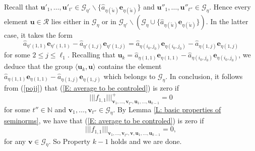 \documentclass[11pt]{amsart}
\theoremstyle{definition}
\newcommand{\N}{{\mathbb N}}
\newcommand{\CG}{{\mathcal G}}
\newcommand{\be}{{\mathbf{e}}}
\newcommand{\bu}{{\mathbf{u}}}
\newcommand{\bv}{{\mathbf{v}}}
\newcommand{\nnorm}[1]{\lvert\!|\!| #1|\!|\!\rvert}
\newcommand{\1}{{\mathbf{1}}}
\begin{document}

 Recall that $\bu'_{1},\dots,\bu'_{t'}\in \CG_{\eta'}\backslash\{\hat{a}_{\eta(\tilde{u})}\be_{\eta(\tilde{u})}\}$  and $\bu''_{1},\dots,\bu''_{t''}\in\CG_\eta$. Hence  every element $\bu\in\mathcal{R}$ lies either in $\CG_{\eta}$ or in $\CG_{\eta'}\backslash(\CG_{\eta}\cup\{\hat{a}_{\eta(\tilde{u})}\be_{\eta(\tilde{u})}\})$. In the latter case, it takes the form 
 $$\hat{a}_{\eta'(1,1)}\be_{\eta'(1,1)}-\hat{a}_{\eta'(1,j)}\be_{\eta'(1,j)}=\hat{a}_{\eta(i_{0},j_{0})}\be_{\eta(i_{0},j_{0})}-\hat{a}_{\eta(1,j)}\be_{\eta(1,j)}$$ 
 for some $2\leq j\leq \ell_1$. Recalling that $\bu_k=\hat{a}_{\eta(1,1)}\be_{\eta(1,1)}-\hat{a}_{\eta(i_{0},j_{0})}\be_{\eta(i_{0},j_{0})}$, we deduce that the group $\langle \bu_k, \bu\rangle$ contains the element $\hat{a}_{\eta(1,1)}\be_{\eta(1,1)}-\hat{a}_{\eta(1,j)}\be_{\eta(1,j)}$ which belongs to $\CG_{\eta}$.
     In conclusion, it follows from (\ref{pojj}) that (\ref{E: average to be controled}) is zero if 
     $$\nnorm{f_{1,1}}^{+}_{{\bv}_{1},\dots,{\bv}_{t''},\bu_{1},\dots,\bu_{k-1}}=0$$
     for some $t''\in\N$ and $\bv_1, \ldots, \bv_{t''}\in\CG_{\eta}$. 
   By Lemma \ref{L: basic properties of seminorms}, we have that  (\ref{E: average to be controled}) is zero if 
     $$\nnorm{f_{1,1}}_{\bv_{1},\dots,{\bv}_{t''},\bv,\bu_{1},\dots,\bu_{k-1}}=0,$$
     for any $\bv\in\CG_{\eta}$.
     So Property $k-1$ holds and we are done.
    
\end{document}
